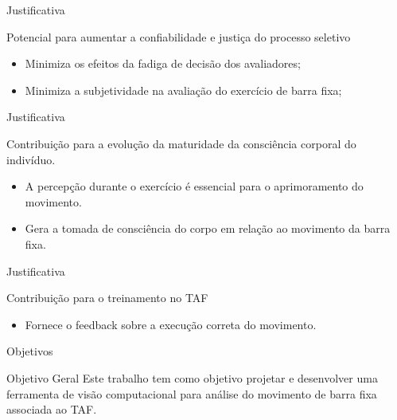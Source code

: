 

\begin{frame}{Justificativa}
    \begin{block}{ Potencial para aumentar a confiabilidade e justiça do processo seletivo}
        \begin{itemize}
            \item  Minimiza os efeitos da fadiga de decisão dos avaliadores;
            \item  Minimiza a subjetividade na avaliação do exercício de barra fixa;
        \end{itemize}
    \end{block}
\end{frame}


\begin{frame}{Justificativa}
    \begin{block}{Contribuição para a evolução da maturidade da consciência corporal do indivíduo.}
        \begin{itemize}
            \item A percepção durante o exercício é essencial para o aprimoramento do movimento.
            \item Gera a tomada de consciência do corpo em relação ao movimento da barra fixa.
        \end{itemize}
    \end{block}
\end{frame}


\begin{frame}{Justificativa}
    \begin{block}{Contribuição para o treinamento no TAF}
        \begin{itemize}
            \item Fornece o feedback sobre a execução correta do movimento.
        \end{itemize}
    \end{block}
\end{frame}





\begin{frame}{Objetivos}
    \begin{block}{Objetivo Geral}
    Este trabalho tem como objetivo projetar e desenvolver uma ferramenta de visão computacional para análise do movimento de barra fixa associada ao TAF.
    \end{block}

\end{frame}



